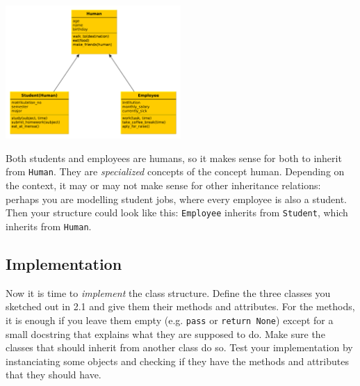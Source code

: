 \begin{solution}
    \begin{center}
        \includegraphics[width=0.5\textwidth]{09_OOP/humans.pdf}
    \end{center}

    \vspace{1em}

    \noindent Both students and employees are humans, so it makes sense for both to inherit from {\tt Human}. They are {\it specialized} concepts of the concept human. Depending on the context, it may or may not make sense for other inheritance relations: perhaps you are modelling student jobs, where every employee is also a student. Then your structure could look like this: {\tt Employee} inherits from {\tt Student}, which inherits from {\tt Human}.
\end{solution}


\subsection{Implementation}

Now it is time to {\it implement} the class structure. Define the three classes you sketched out in 2.1 and give them their methods and attributes. For the methods, it is enough if you leave them empty (e.g. {\tt pass} or {\tt return None}) except for a small docstring that explains what they are supposed to do. Make sure the classes that should inherit from another class do so. Test your implementation by instanciating some objects and checking if they have the methods and attributes that they should have.

\vspace{1em}

